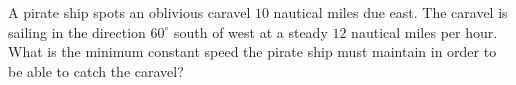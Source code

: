 A pirate ship spots an oblivious caravel $10$ nautical miles due east. The caravel is sailing in the direction $60^\circ$ south of west at a steady $12$ nautical miles per hour. What is the minimum constant speed the pirate ship must maintain in order to be able to catch the caravel?
